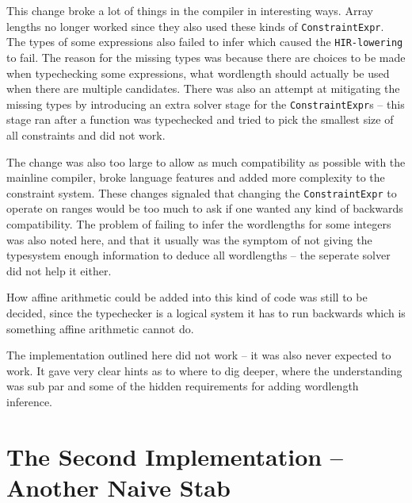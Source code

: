 This change broke a lot of things in the compiler in interesting ways. Array lengths no longer worked since they also used these kinds of \verb+ConstraintExpr+. The types of some expressions also failed to infer which caused the \verb+HIR-lowering+ to fail. The reason for the missing types was because there are choices to be made when typechecking some expressions, what wordlength should actually be used when there are multiple candidates. There was also an attempt at mitigating the missing types by introducing an extra solver stage for the \verb+ConstraintExpr+s -- this stage ran after a function was typechecked and tried to pick the smallest size of all constraints and did not work.

The change was also too large to allow as much compatibility as possible with the mainline compiler, broke language features and added more complexity to the constraint system. These changes signaled that changing the \verb+ConstraintExpr+ to operate on ranges would be too much to ask if one wanted any kind of backwards compatibility. The problem of failing to infer the wordlengths for some integers was also noted here, and that it usually was the symptom of not giving the typesystem enough information to deduce all wordlengths -- the seperate solver did not help it either.

How affine arithmetic could be added into this kind of code was still to be decided, since the typechecker is a logical system it has to run backwards which is something affine arithmetic cannot do.

The implementation outlined here did not work -- it was also never expected to work. It gave very clear hints as to where to dig deeper, where the understanding was sub par and some of the hidden requirements for adding wordlength inference.

\section{The Second Implementation -- Another Naive Stab}
\label{sec:Second}

